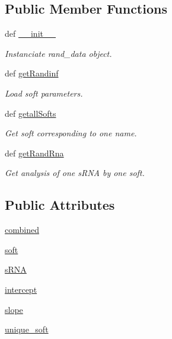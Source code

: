 \subsection*{\-Public \-Member \-Functions}
\begin{DoxyCompactItemize}
\item 
def \hyperlink{classirna_1_1iRNA__stat_1_1Rand__data_1_1Rand__data_abc54bdf76986b7d5fe47202df9ecf01d}{\-\_\-\-\_\-init\-\_\-\-\_\-}
\begin{DoxyCompactList}\small\item\em \-Instanciate rand\-\_\-data object. \end{DoxyCompactList}\item 
def \hyperlink{classirna_1_1iRNA__stat_1_1Rand__data_1_1Rand__data_a499ae6eb55cbbeb88c028d089a72d57a}{get\-Randinf}
\begin{DoxyCompactList}\small\item\em \-Load soft parameters. \end{DoxyCompactList}\item 
def \hyperlink{classirna_1_1iRNA__stat_1_1Rand__data_1_1Rand__data_a1c7278ff5d15438d2daa23588479a0af}{getall\-Softs}
\begin{DoxyCompactList}\small\item\em \-Get soft corresponding to one name. \end{DoxyCompactList}\item 
def \hyperlink{classirna_1_1iRNA__stat_1_1Rand__data_1_1Rand__data_a1a9b2767fcb24e2a4c5a3e51909485ea}{get\-Rand\-Rna}
\begin{DoxyCompactList}\small\item\em \-Get analysis of one s\-R\-N\-A by one soft. \end{DoxyCompactList}\end{DoxyCompactItemize}
\subsection*{\-Public \-Attributes}
\begin{DoxyCompactItemize}
\item 
\hyperlink{classirna_1_1iRNA__stat_1_1Rand__data_1_1Rand__data_aa1ac778e7e1c438d4194c434a4af31e3}{combined}
\item 
\hyperlink{classirna_1_1iRNA__stat_1_1Rand__data_1_1Rand__data_aa063aa12d9c46b1bd0bd7af06b9a1839}{soft}
\item 
\hyperlink{classirna_1_1iRNA__stat_1_1Rand__data_1_1Rand__data_a6aaa1750f57237352b08a327783f12fd}{s\-R\-N\-A}
\item 
\hyperlink{classirna_1_1iRNA__stat_1_1Rand__data_1_1Rand__data_aa1808f84f3d939afdc68c7738210a9bf}{intercept}
\item 
\hyperlink{classirna_1_1iRNA__stat_1_1Rand__data_1_1Rand__data_a7486656c8efa8f63975e5ad533a2699b}{slope}
\item 
\hyperlink{classirna_1_1iRNA__stat_1_1Rand__data_1_1Rand__data_ac11017fe00c08f8e96e908d50e81de9f}{unique\-\_\-soft}
\end{DoxyCompactItemize}


